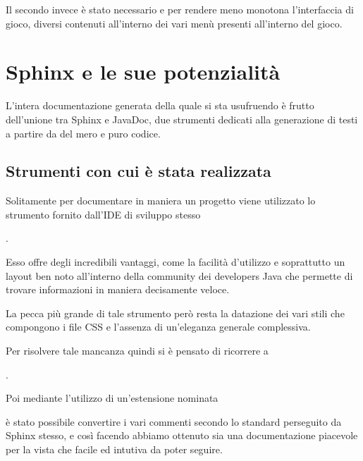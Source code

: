 \documentclass[letterpaper,10pt,italian,openany,oneside]{sphinxmanual}
\begin{document}
Il secondo invece è stato necessario  e per rendere meno monotona l’interfaccia di gioco,  diversi contenuti all’interno dei vari menù presenti all’interno del gioco.


\chapter{Sphinx e le sue potenzialità}
\label{\detokenize{sphinx:sphinx-e-le-sue-potenzialita}}\label{\detokenize{sphinx::doc}}
L’intera documentazione generata della quale si sta usufruendo è frutto dell’unione tra Sphinx e JavaDoc, due strumenti
dedicati alla generazione di testi a partire da del mero e puro codice.


\section{Strumenti con cui è stata realizzata}
\label{\detokenize{sphinx:strumenti-con-cui-e-stata-realizzata}}
Solitamente per documentare in maniera  un progetto  viene utilizzato
lo strumento fornito dall’IDE di sviluppo stesso  %
\begin{footnote}[1]\sphinxAtStartFootnote
{}
%
\end{footnote}.

Esso offre degli incredibili vantaggi, come la facilità d’utilizzo e soprattutto un
layout ben noto all’interno della community dei developers Java che permette
di trovare informazioni in maniera decisamente veloce.

La pecca più grande di tale strumento però resta la datazione dei vari stili che compongono
i file CSS e l’assenza di un’eleganza generale complessiva.

Per risolvere tale mancanza quindi si è pensato di ricorrere a  %
\begin{footnote}[2]\sphinxAtStartFootnote
{}
%
\end{footnote}.

Poi mediante l’utilizzo di un’estensione nominata  %
\begin{footnote}[3]\sphinxAtStartFootnote
{}
%
\end{footnote} è stato possibile
convertire i vari commenti  secondo lo standard perseguito da Sphinx stesso, e così
facendo abbiamo ottenuto sia una documentazione piacevole per la vista che
facile ed intutiva da poter seguire.
\end{document}
